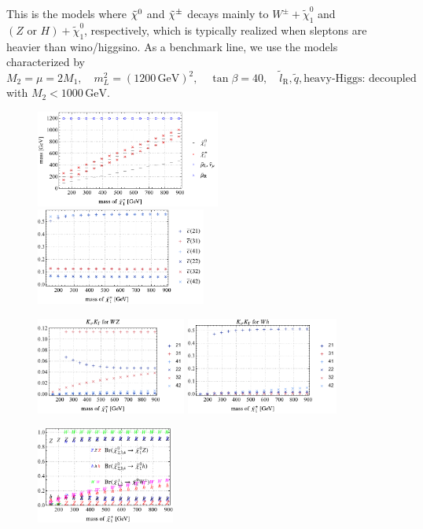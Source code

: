 \documentclass[a4paper,10pt,captions=tableheading,DIV=14]{scrartcl}
\numberwithin{equation}{section}
\newcommand\w[1]{_{\mathrm{#1}}}
\newcommand\unit[1]{\,\mathrm{#1}\xspace}
\newcommand\GeV{\unit{GeV}}
\newcommand\neut  [1][\relax]{{\tilde\chi^0_{#1}}}
\newcommand\charPM[1][\relax]{{\tilde\chi^\pm_{#1}}}
\begin{document}
This is the models where $\neut$ and $\charPM$ decays mainly to $W^\pm+\neut[1]$ and $(Z\text{ or }H)+\neut[1]$, respectively, which is typically realized when sleptons are heavier than wino/higgsino.
As a benchmark line, we use the models characterized by
\begin{equation}
 M_2=\mu=2M_1,
\quad
 m^2_L=(1200\GeV)^2,
\quad
 \tan\beta=40,
\quad
 \tilde l\w R, \tilde q, \text{heavy-Higgs: decoupled}
\end{equation}
with $M_2<1000\GeV$.

\begin{figure}[h]
  \centering
  \includegraphics[height=90pt]{../plots/plot_tab1boson_mass.pdf}
  \includegraphics[height=90pt]{../plots/plot_tab1boson_cfactors.pdf}
\par
  \includegraphics[height=90pt]{../plots/plot_tab1boson_WZ.pdf}
  \includegraphics[height=90pt]{../plots/plot_tab1boson_WH.pdf}
\par
  \includegraphics[height=90pt]{../plots/plot_tab1boson_br.pdf}

\end{figure}
\end{document}
